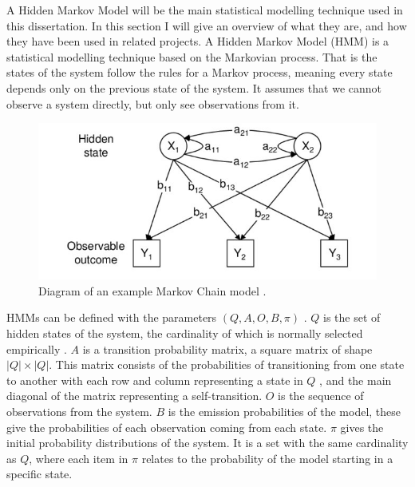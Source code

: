 \documentclass{article}
\begin{document}
A Hidden Markov Model will be the main statistical modelling technique used in this dissertation.
In this section I will give an overview of what they are, and how they have been used in related projects.
A Hidden Markov Model (HMM) is a statistical modelling technique based on the Markovian process. %
That is the states of the system follow the rules for a Markov process, meaning every state depends only on the previous state of the system.
It assumes that we cannot observe a system directly, but only see observations from it.

\begin{figure}[ht!]
    \centering
    \includegraphics[scale=1.5]{Images/HMM-Paper-Diagram.png}
    \caption{Diagram of an example Markov Chain model \cite{choudhury2007state}.}
    \label{fig:Markov}
\end{figure}

HMMs can be defined with the parameters $(Q,A,O,B,\pi)$ \cite{jurafsky2018speech}.
$Q$ is the set of hidden states of the system, the cardinality of which is normally selected empirically \cite{ibe2013markov}.
$A$ is a transition probability matrix, a square matrix of shape $|Q|\times|Q|$.
This matrix consists of the probabilities of transitioning from one state to another with each row and column representing a state in $Q$
, and the main diagonal of the matrix representing a self-transition.
$O$ is the sequence of observations from the system.
$B$ is the emission probabilities of the model, these give the probabilities of each observation coming from each state.
$\pi$ gives the initial probability distributions of the system.
It is a set with the same cardinality as $Q$, where each item in $\pi$ relates to the probability of the model starting in a specific state.
\end{document}
